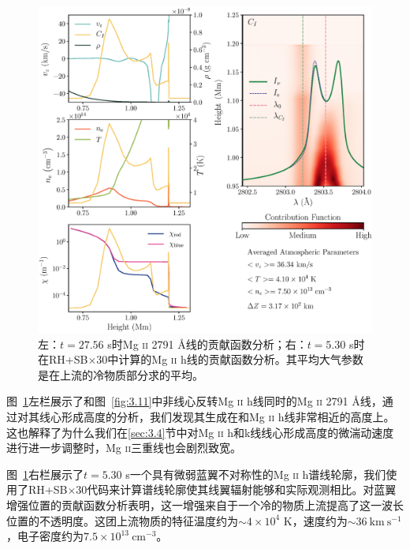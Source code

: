 \begin{figure}[htbp]
\begin{minipage}[t]{0.5\linewidth}
	\includegraphics[width=\linewidth]{figs/ctb_5F11_44}
	\end{minipage}
	\caption{左：$t=27.56$ s时Mg \textsc{ii} 2791 \mbox{\AA}线的贡献函数分析；右：$t=5.30$ s时在RH+SB$\times$30中计算的Mg \textsc{ii} h线的贡献函数分析。其平均大气参数是在上流的冷物质部分求的平均。}
	\label{fig:3.12}
\end{figure}

图~\ref{fig:3.12}左栏展示了和图~\ref{fig:3.11}中非线心反转Mg \textsc{ii} h线同时的Mg \textsc{ii} 2791 \mbox{\AA}线，通过对其线心形成高度的分析，我们发现其生成在和Mg \textsc{ii} h线非常相近的高度上。这也解释了为什么我们在\ref{sec:3.4}节中对Mg \textsc{ii} h和k线线心形成高度的微湍动速度进行进一步调整时，Mg \textsc{ii}三重线也会剧烈致宽。

图~\ref{fig:3.12}右栏展示了$t=5.30$ s一个具有微弱蓝翼不对称性的Mg \textsc{ii} h谱线轮廓，我们使用了RH+SB$\times$30代码来计算谱线轮廓使其线翼辐射能够和实际观测相比。对蓝翼增强位置的贡献函数分析表明，这一增强来自于一个冷的物质上流提高了这一波长位置的不透明度。这团上流物质的特征温度约为$\sim4\times10^4$ K，速度约为$\sim 36\ \mathrm{km\  s^{-1}}$，电子密度约为$7.5\times10^{13}\ \mathrm{cm^{-3}}$。

